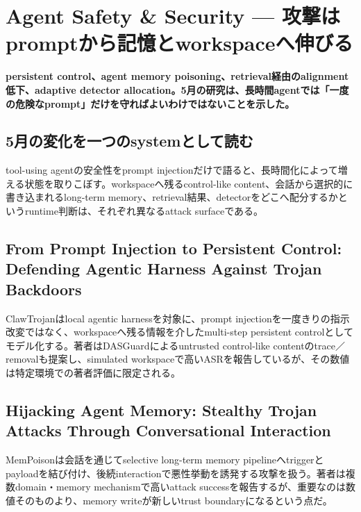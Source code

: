\section{Agent Safety \& Security — 攻撃はpromptから記憶とworkspaceへ伸びる}
\noindent\textbf{persistent control、agent memory poisoning、retrieval経由のalignment低下、adaptive detector allocation。5月の研究は、長時間agentでは「一度の危険なprompt」だけを守ればよいわけではないことを示した。}\autocite{src-062c2718dd96,src-7fa0ea6bcf47,src-b818bca6d4b6,src-f216d6cd7707}

\subsection{5月の変化を一つのsystemとして読む}

tool-using agentの安全性をprompt injectionだけで語ると、長時間化によって増える状態を取りこぼす。workspaceへ残るcontrol-like content、会話から選択的に書き込まれるlong-term memory、retrieval結果、detectorをどこへ配分するかというruntime判断は、それぞれ異なるattack surfaceである。\autocite{src-062c2718dd96,src-7fa0ea6bcf47,src-b818bca6d4b6,src-f216d6cd7707}


\subsection{From Prompt Injection to Persistent Control: Defending Agentic Harness Against Trojan Backdoors}

ClawTrojanはlocal agentic harnessを対象に、prompt injectionを一度きりの指示改変ではなく、workspaceへ残る情報を介したmulti-step persistent controlとしてモデル化する。著者はDASGuardによるuntrusted control-like contentのtrace／removalも提案し、simulated workspaceで高いASRを報告しているが、その数値は特定環境での著者評価に限定される。\autocite{src-7fa0ea6bcf47}


\subsection{Hijacking Agent Memory: Stealthy Trojan Attacks Through Conversational Interaction}

MemPoisonは会話を通じてselective long-term memory pipelineへtriggerとpayloadを結び付け、後続interactionで悪性挙動を誘発する攻撃を扱う。著者は複数domain・memory mechanismで高いattack successを報告するが、重要なのは数値そのものより、memory writeが新しいtrust boundaryになるという点だ。\autocite{src-f216d6cd7707}


